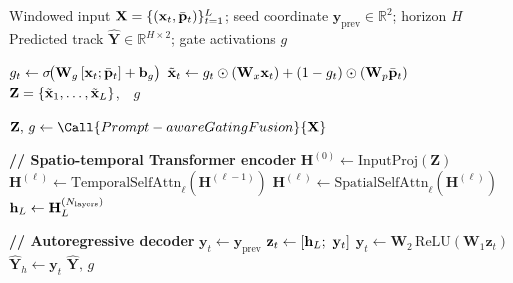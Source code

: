 \begin{algorithm}[t]
\caption{\textsc{TyphoFormer-Forward}: PGF Fusion, ST-Encoder, AR-Decoder}
\label{alg:typhoformer-forward}
\begin{algorithmic}[1]
\Require Windowed input $\mathbf{X}=\{(\mathbf{x}_t,\bar{\mathbf{p}}_t)\}_{t=1}^{L}$;
         seed coordinate $\mathbf{y}_{\text{prev}}\in\mathbb{R}^2$; horizon $H$
\Ensure  Predicted track $\hat{\mathbf{Y}}\in\mathbb{R}^{H\times 2}$;
         gate activations $g$

    \State $g_t \gets \sigma\!\big(\mathbf{W}_g\,[\mathbf{x}_t;\bar{\mathbf{p}}_t] + \mathbf{b}_g\big)$
    \State $\tilde{\mathbf{x}}_t \gets g_t \odot (\mathbf{W}_x\mathbf{x}_t)
                       + (1-g_t)\odot(\mathbf{W}_p\bar{\mathbf{p}}_t)$
  \EndFor
  \State \Return $\mathbf{Z}=\{\tilde{\mathbf{x}}_1,\dots,\tilde{\mathbf{x}}_L\}$,\ \ $g$
\EndProcedure

\Statex
\State $\mathbf{Z},\, g \gets \Call{Prompt-aware Gating Fusion}{\mathbf{X}}$

\Statex \textbf{// Spatio-temporal Transformer encoder}
\State $\mathbf{H}^{(0)} \gets \text{InputProj}(\mathbf{Z})$
  \State $\mathbf{H}^{(\ell)} \gets \text{TemporalSelfAttn}_\ell(\mathbf{H}^{(\ell-1)})$
  \State $\mathbf{H}^{(\ell)} \gets \text{SpatialSelfAttn}_\ell(\mathbf{H}^{(\ell)})$
\EndFor
\State $\mathbf{h}_L \gets \mathbf{H}^{(N_{\text{layers}})}_{L}$

\Statex \textbf{// Autoregressive decoder}
\State $\mathbf{y}_t \gets \mathbf{y}_{\text{prev}}$
  \State $\mathbf{z}_t \gets [\hstate_L;\ \mathbf{y}_t]$
  \State $\mathbf{y}_t \gets \mathbf{W}_2\,\text{ReLU}(\mathbf{W}_1\mathbf{z}_t)$
  \State $\hat{\mathbf{Y}}_h \gets \mathbf{y}_t$
\EndFor
\State \Return $\hat{\mathbf{Y}},\, g$
\end{algorithmic}
\end{algorithm}
